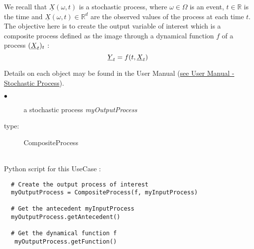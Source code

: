 \renewcommand{\filename}{docUC_StocProc_CompositeProcess.tex}
\renewcommand{\filetitle}{UC : Creation of a Composite Process}

\HeaderIIILevel

\label{UCprocess}




We recall that  $\underline{X}(\omega,t)$ is a stochastic process, where $\omega \in \Omega$ is an event, $t \in \mathbb{R}$ is the time and $\underline{X}(\omega,t) \in \mathbb{R}^d$ are the observed values of the process at each time $t$.\\

The objective here is to create the output variable of interest which is a  composite process defined as the image through a dynamical function $f$ of a process $({\underline{X}}_t)_t$ : 
\begin{equation} 
{\underline{Y}}_t = f(t, {\underline{X}}_t)
\end{equation}


Details on each object may be found in the User Manual  (\href{OpenTURNS_UserManual_TUI.pdf}{see User Manual - Stochastic Process}).\\

{

  \begin{description}
  \item[$\bullet$] a stochastic process {\itshape myOutputProcess}
  \item[type:]  CompositeProcess
  \end{description}
}

\textspace\\
Python script for this UseCase :

\begin{lstlisting}
  # Create the output process of interest
  myOutputProcess = CompositeProcess(f, myInputProcess)

  # Get the antecedent myInputProcess
  myOutputProcess.getAntecedent()

  # Get the dynamical function f
   myOutputProcess.getFunction()
\end{lstlisting}
